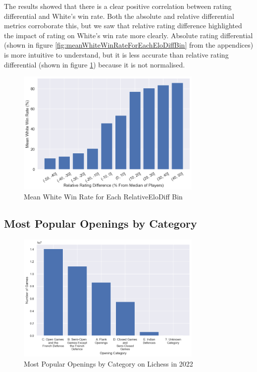 \documentclass[a4paper, 11pt]{article}
\begin{document}
The results showed that there is a clear positive correlation between rating differential and White's win rate. Both the absolute and relative differential metrics corroborate this, but we saw that relative rating difference highlighted the impact of rating on White's win rate more clearly. Absolute rating differential (shown in figure \ref{fig:meanWhiteWinRateForEachEloDiffBin} from the appendices) is more intuitive to understand, but it is less accurate than relative rating differential (shown in figure \ref{fig:meanWhiteWinRateForEachRelativeEloDiffBin}) because it is not normalised.

\begin{figure}[H]
    \centering
    \caption{Mean White Win Rate for Each RelativeEloDiff Bin}
    \label{fig:meanWhiteWinRateForEachRelativeEloDiffBin}
    \includegraphics[width=0.8\textwidth]{Mean White Win Rate for Each RelativeEloDiff Bin.png}
\end{figure}

\subsection{Most Popular Openings by Category}
\begin{figure}[H]
    \centering
    \caption{Most Popular Openings by Category on Lichess in 2022}
    \label{fig:mostPopularOpeningsByCategory}
    \includegraphics[width=0.8\textwidth]{Most Popular Openings by Category.png}
\end{figure}
\end{document}
